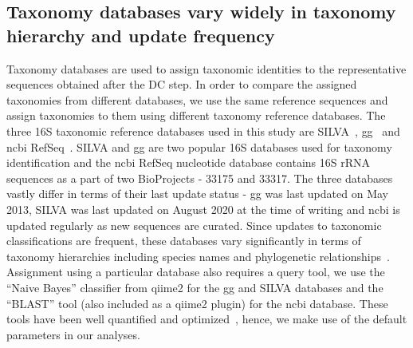   \FloatBarrier

  \subsection*{Taxonomy databases vary widely in taxonomy hierarchy and update frequency}

  Taxonomy databases are used to assign taxonomic identities to the representative sequences obtained after the DC step.
  In order to compare the assigned taxonomies from different databases, we use the same reference sequences and assign taxonomies to them using different taxonomy reference databases.
  The three 16S taxonomic reference databases used in this study are SILVA~\cite{Quast2012}, \ac{gg}~\cite{DeSantis2006} and \ac{ncbi} RefSeq~\cite{Sayers2009}.
  SILVA and \ac{gg} are two popular 16S databases used for taxonomy identification and the \ac{ncbi} RefSeq nucleotide database contains 16S rRNA sequences as a part of two BioProjects - 33175 and 33317.
  The three databases vastly differ in terms of their last update status - \ac{gg} was last updated on May 2013, SILVA was last updated on August 2020 at the time of writing and \ac{ncbi} is updated regularly as new sequences are curated.
  Since updates to taxonomic classifications are frequent, these databases vary significantly in terms of taxonomy hierarchies including species names and phylogenetic relationships~\cite{Balvociute2017}.
  Assignment using a particular database also requires a query tool, we use the ``Naive Bayes'' classifier from \ac{qiime2} for the \ac{gg} and SILVA databases and the ``BLAST'' tool (also included as a \ac{qiime2} plugin) for the \ac{ncbi} database.
  These tools have been well quantified and optimized~\cite{bokulichOptimizingTaxonomicClassification2018}, hence, we make use of the default parameters in our analyses.

